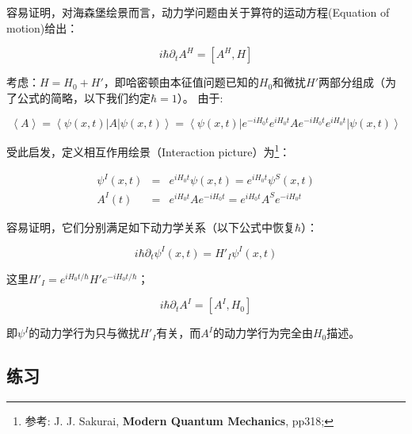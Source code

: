 容易证明，对海森堡绘景而言，动力学问题由关于算符的运动方程(Equation
of motion)给出：


\begin{equation*}
    i\hbar \partial_t A^H =[A^H,H]
\end{equation*}


考虑：$H = H_0 +
H'$，即哈密顿由本征值问题已知的$H_0$和微扰$H'$两部分组成（为了公式的简略，以下我们约定$\hbar=1$）。
由于:


\begin{equation*}
    \left\langle A \right\rangle  = \left\langle {\psi (x,t)} \right|A\left| {\psi (x,t)} \right\rangle  = \left\langle {\psi (x,t)} \right|e^{ - iH_0 t} e^{iH_0 t} Ae^{ - iH_0 t} e^{iH_0 t} \left| {\psi (x,t)} \right\rangle
\end{equation*}


受此启发，定义相互作用绘景（Interaction picture）为\footnote{参考:
J. J. Sakurai, \textbf{Modern Quantum Mechanics}, pp318;}：



\begin{eqnarray*}
  \psi^I(x,t) &=& e^{iH_0t}\psi(x,t) = e^{iH_0t}\psi^S(x,t)\\
  A^I(t) &=& e^{iH_0t}Ae^{-iH_0t} = e^{iH_0t}A^Se^{-iH_0t}
\end{eqnarray*}

容易证明，它们分别满足如下动力学关系（以下公式中恢复$\hbar$）：

\begin{equation*}
    i\hbar \partial_t \psi^I (x,t) = H'_I \psi^I (x,t)
\end{equation*}

这里$H'_I = e^{iH_0t/\hbar} H' e^{-iH_0t/\hbar}$；


\begin{equation*}
  i\hbar \partial_t A^I = [A^I, H_0]
\end{equation*}

即$\psi^I$的动力学行为只与微扰$H'_I$有关，而$A^I$的动力学行为完全由$H_0$描述。


\subsection*{练习}

